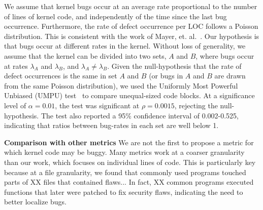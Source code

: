 We assume that kernel bugs occur at an average rate proportional to the 
number of lines of kernel code, and independently of the time since the last 
bug occurrence. Furthermore, the rate of defect occurrence per LOC 
follows a Poisson distribution. 
This is consistent with the work of Mayer, et. al.~\cite{mayer1989probability}. 
Our hypothesis is that bugs occur at different rates in the kernel. Without 
loss of generality, we assume that the kernel can be divided into two sets, 
$A$ and $B$, where bugs occur at rates $\lambda_A$ and 
$\lambda_B$, and $\lambda_A \neq \lambda_B$. Given the null-hypothesis 
that the rate of defect occurrences is the same in set $A$ and $B$ 
(or bugs in $A$ and $B$ are drawn from the same Poisson distribution), 
we used the Uniformly Most Powerful Unbiased (UMPU) test~\cite{shiue1982experiment} 
to compare unequal-sized code blocks. 
At a significance level of $\alpha=0.01$, the test was significant at
$\rho=0.0015$, rejecting the null-hypothesis. 
The test also reported a 95\% confidence interval of
0.002-0.525, indicating that ratios between bug-rates in each set are well
below 1. 


\textbf{Comparison with other metrics}
We are not the first to propose a metric for which kernel code may be buggy.
Many metrics work at a coarser granularity than our work, which focuses on
individual lines of code.  This is particularly key because at a file 
granularity, we found that commonly used programs touched parts of
XX files that contained flaws...  In fact, XX common 
programs executed functions that later were patched to fix security
flaws, indicating the need to better localize bugs.


